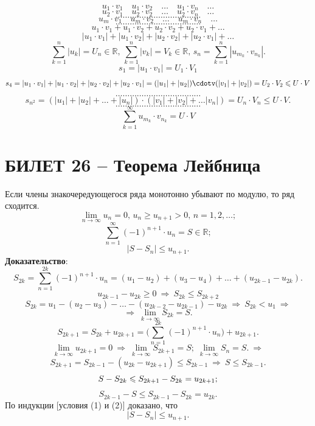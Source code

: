 \documentclass{article}
\newcommand{\R}{\mathbb R}
\begin{document}
$$ u_{1}\cdot v_{1}\quad u_{1}\cdot v_{2}\quad\ldots\quad u_{1}\cdot v_{n}\quad\ldots $$
$$ u_{2}\cdot v_{1}\quad u_{2}\cdot v_{2}\quad\ldots\quad u_{2}\cdot v_{n}\quad\ldots $$
$$\ldots\ldots\ldots\ldots\ldots\ldots\ldots\ldots\ldots\ldots\ldots\ldots$$
$$ u_{m}\cdot v_{1}\quad u_{m}\cdot v_{2}\quad\ldots\quad u_{m}\cdot v_{n}\quad\ldots $$
$$\ldots\ldots\ldots\ldots\ldots\ldots\ldots\ldots\ldots\ldots\ldots\ldots$$
$$  $$
$$ u_{1}\cdot v_{1}+u_{1}\cdot v_{2}+u_{2}\cdot v_{2}+u_{2}\cdot v_{1}+\ldots $$
$$ |u_{1}\cdot v_{1}|+|u_{1}\cdot v_{2}|+|u_{2}\cdot v_{2}|+|u_{2}\cdot v_{1}|+\ldots $$
$$ \sum_{k=1}^{n}|u_{k}|=U_{n}\in\R,\,\sum_{k=1}^{n}|v_{k}|=V_{k}\in\R,\,s_{n}=\sum_{k=1}^{n}|u_{m_{k}}\cdot v_{n_{k}}|. $$
$$ s_{1}=|u_1\cdot v_1|=U_1\cdot V_1 $$
$$ s_4=|u_{1}\cdot v_{1}|+|u_{1}\cdot v_{2}|+|u_{2}\cdot v_{2}|+|u_{2}\cdot v_{1}|=(|u_1|+|u_2|)\cdotv(|v_1|+|v_2|)=U_2\cdot V_2\leqslant U\cdot V $$
$$\ldots\ldots\ldots\ldots\ldots\ldots\ldots\ldots\ldots\ldots\ldots\ldots$$
$$ s_{n^2}=(|u_1|+|u_2|+\ldots+|u_n|)\cdot(|v_1|+|v_2|+\ldots|v_n|)=U_n\cdot V_n\leqslant U\cdot V. $$
$$\ldots\ldots\ldots\ldots\ldots\ldots\ldots\ldots\ldots\ldots\ldots\ldots$$
$$ \sum_{k=1}^{\infty}u_{m_k}\cdot v_{n_k}=U\cdot V $$

\newpage
\section{БИЛЕТ 26 -- Теорема Лейбница}
Если члены знакочередующегося ряда монотонно убывают по модулю, то ряд сходится.
$$ \lim_{n\to\infty}u_{n}=0,\,u_{n}\geqslant u_{n+1}>0,\,n=1,2,\ldots; $$
$$ \sum_{n=1}^{\infty}(-1)^{n+1}\cdot u_{n}=S\in \R; $$
$$ |S-S_{n}|\leqslant u_{n+1}. $$
\textbf{Доказательство}:
$$ S_{2k}=\sum_{n=1}^{2k}(-1)^{n+1}\cdot u_n=(u_1-u_2)+(u_3-u_4)+\ldots+(u_{2k-1}-u_{2k}). $$
$$ u_{2k-1}-u_{2k}\geqslant0\:\Rightarrow\:S_{2k}\leqslant S_{2k+2} $$
$$S_{2k}=u_1-(u_2-u_3)-\ldots-(u_{2k-2}-u_{2k-1})-u_{2k}\:\Rightarrow\:S_{2k}<u_1\:\Rightarrow $$
$$ \Rightarrow\:\lim_{k\to\infty}S_{2k}=S. $$
$$ S_{2k+1}=S_{2k}+u_{2k+1}=\Bigg(\sum_{n=1}^{2k}(-1)^{n+1}\cdot u_n\Bigg) +u_{2k+1}.$$
$$ \lim_{k\to\infty} u_{2k+1}=0\:\Rightarrow\:\lim_{k\to\infty}S_{2k+1}=S;\;\lim_{k\to\infty} S_n=S.\:\Rightarrow $$
$$ S_{2k+1}=S_{2k-1}-(u_{2k}-u_{2k+1})\leqslant S_{2k-1}\:\Rightarrow\:S\leqslant S_{2k-1}. $$
$$  $$
\begin{equation}
    \setcounter{equation}{1}
    S-S_{2k}\leqslant S_{2k+1}-S_{2k}=u_{2k+1};
\end{equation}
\begin{equation}
    S_{2k-1}-S\leqslant S_{2k-1}-S_{2k}=u_{2k}.
\end{equation}
По индукции [условия (1) и (2)] доказано, что
$$ |S-S_n|\leqslant u_{n+1}. $$
\newpage
\end{document}
